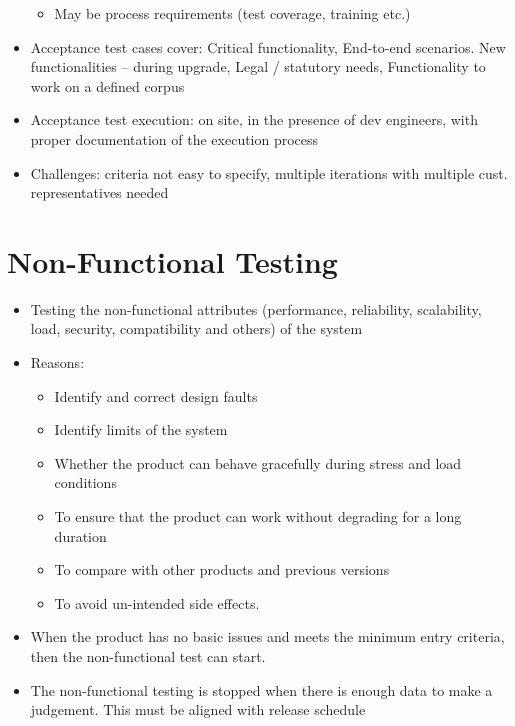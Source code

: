 \documentclass{article}
\begin{document}
\begin{itemize}
\begin{itemize}
        \item May be process requirements (test coverage, training etc.)
    \end{itemize}
    
    \item Acceptance test cases cover: Critical functionality, End-to-end scenarios. New functionalities – during upgrade, Legal / statutory needs, Functionality to work on a defined corpus
    
    \item Acceptance test execution: on site, in the presence of dev engineers, with proper documentation of the execution process
    
    \item Challenges: criteria not easy to specify, multiple iterations with multiple cust. representatives needed
\end{itemize}

\section{Non-Functional Testing}
\begin{itemize}
    \item Testing the non-functional attributes (performance, reliability, scalability, load, security, compatibility and others) of the system
    
    \item Reasons:
    \begin{itemize}
        \item Identify and correct design faults
        
        \item Identify limits of the system
        
        \item Whether the product can behave gracefully during stress and load conditions

        \item To ensure that the product can work without degrading  for a long duration

        \item To compare with other products and previous versions

        \item To avoid un-intended side effects.
    \end{itemize}
    
    \item When the product has no basic issues and meets the minimum entry criteria, then the non-functional test can start.
    
    \item The non-functional testing is stopped when there is enough data to make a judgement. This must be aligned with release schedule
\end{itemize}
\end{document}
